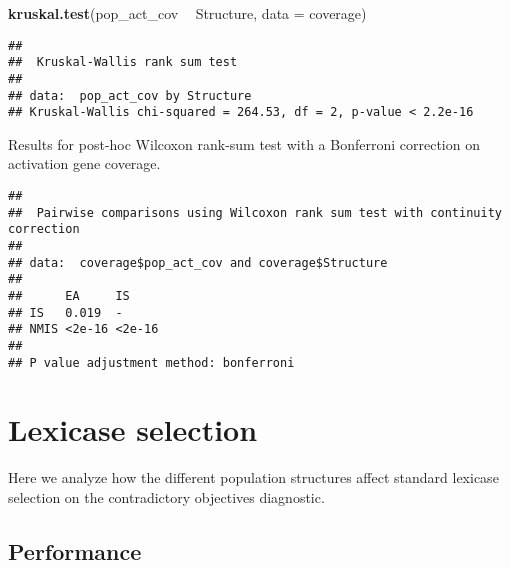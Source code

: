 \documentclass[]{book}
\newenvironment{Shaded}{\begin{snugshade}}{\end{snugshade}}
\newcommand{\DataTypeTok}[1]{\textcolor[rgb]{0.13,0.29,0.53}{#1}}
\newcommand{\KeywordTok}[1]{\textcolor[rgb]{0.13,0.29,0.53}{\textbf{#1}}}
\newcommand{\NormalTok}[1]{#1}
\newcommand{\OperatorTok}[1]{\textcolor[rgb]{0.81,0.36,0.00}{\textbf{#1}}}
\newcommand{\OtherTok}[1]{\textcolor[rgb]{0.56,0.35,0.01}{#1}}
\newcommand{\StringTok}[1]{\textcolor[rgb]{0.31,0.60,0.02}{#1}}
\begin{document}
\begin{Shaded}
\begin{Highlighting}[]
\KeywordTok{kruskal.test}\NormalTok{(pop_act_cov }\OperatorTok{~}\StringTok{ }\NormalTok{Structure, }\DataTypeTok{data =}\NormalTok{ coverage)}
\end{Highlighting}
\end{Shaded}

\begin{verbatim}
## 
##  Kruskal-Wallis rank sum test
## 
## data:  pop_act_cov by Structure
## Kruskal-Wallis chi-squared = 264.53, df = 2, p-value < 2.2e-16
\end{verbatim}

Results for post-hoc Wilcoxon rank-sum test with a Bonferroni correction on activation gene coverage.

\begin{Shaded}
\end{Shaded}

\begin{verbatim}
## 
##  Pairwise comparisons using Wilcoxon rank sum test with continuity correction 
## 
## data:  coverage$pop_act_cov and coverage$Structure 
## 
##      EA     IS    
## IS   0.019  -     
## NMIS <2e-16 <2e-16
## 
## P value adjustment method: bonferroni
\end{verbatim}

\hypertarget{lexicase-selection-3}{%
\section{Lexicase selection}\label{lexicase-selection-3}}

Here we analyze how the different population structures affect standard lexicase selection on the contradictory objectives diagnostic.

\hypertarget{performance-2}{%
\subsection{Performance}\label{performance-2}}
\end{document}

